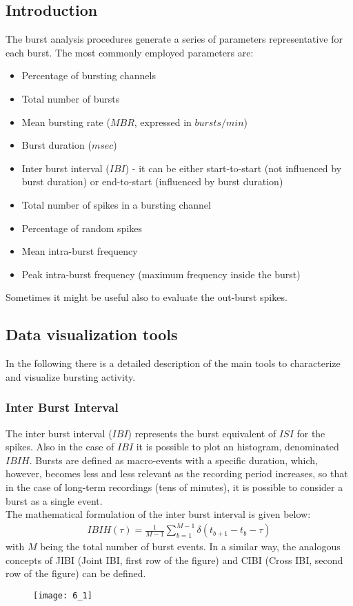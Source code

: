 \subsection{Introduction}
The burst analysis procedures generate a series of parameters representative for
each burst. The most commonly employed parameters are:
\begin{itemize}
    \item Percentage of bursting channels
    \item Total number of bursts
    \item Mean bursting rate (\(MBR\), expressed in \(bursts/min\))
    \item Burst duration (\(msec\))
    \item Inter burst interval (\(IBI\)) - it can be either start-to-start (not
          influenced by burst duration) or end-to-start (influenced by burst duration)
    \item Total number of spikes in a bursting channel
    \item Percentage of random spikes
    \item Mean intra-burst frequency
    \item Peak intra-burst frequency (maximum frequency inside the burst)
\end{itemize}
Sometimes it might be useful also to evaluate the out-burst spikes.

\subsection{Data visualization tools}
In the following there is a detailed description of the main tools to characterize and
visualize bursting activity.

\subsubsection{Inter Burst Interval}
The inter burst interval (\(IBI\)) represents the burst equivalent of \(ISI\) for the 
spikes. Also in the case of \(IBI\) it is possible to plot an histogram, denominated \(IBIH\). 
Bursts are defined as macro-events with a specific duration, which, however, becomes less and 
less relevant as the recording period increases, so that in the case of long-term recordings 
(tens of minutes), it is possible to consider a burst as a single event.\\
The mathematical formulation of the inter burst interval is given below:
\begin{align*}
    IBIH(\tau)=\frac{1}{M-1}\sum_{b=1}^{M-1}\delta(t_{b+1}-t_{b}-\tau)
\end{align*}
with \(M\) being the total number of burst events.
In a similar way, the analogous concepts of JIBI (Joint IBI, first row of the figure) 
and CIBI (Cross IBI, second row of the figure) can be defined.
\begin{figure}[H]
    \texttt{[image: 6\_1]}
    \centering
\end{figure}

